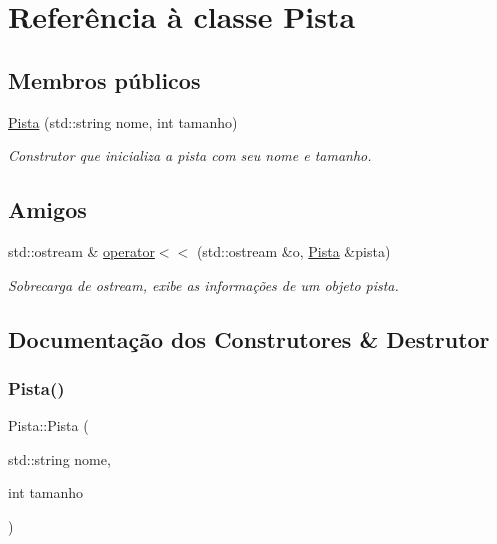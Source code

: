 \hypertarget{classPista}{}\section{Referência à classe Pista}
\label{classPista}
\subsection*{Membros públicos}
\begin{DoxyCompactItemize}
\item 
\hyperlink{classPista_a037a3c407c56d95fa98c6e0525de28cc}{Pista} (std\+::string nome, int tamanho)
\begin{DoxyCompactList}\small\item\em Construtor que inicializa a pista com seu nome e tamanho. \end{DoxyCompactList}\end{DoxyCompactItemize}
\subsection*{Amigos}
\begin{DoxyCompactItemize}
\item 
std\+::ostream \& \hyperlink{classPista_a22c7e3e6f6a5da426ab7e401e3567185}{operator$<$$<$} (std\+::ostream \&o, \hyperlink{classPista}{Pista} \&pista)
\begin{DoxyCompactList}\small\item\em Sobrecarga de ostream, exibe as informações de um objeto pista. \end{DoxyCompactList}\end{DoxyCompactItemize}


\subsection{Documentação dos Construtores \& Destrutor}
\mbox{\label{classPista_a037a3c407c56d95fa98c6e0525de28cc}} 
\subsubsection{\texorpdfstring{Pista()}{Pista()}}
{\footnotesize\ttfamily Pista\+::\+Pista (\begin{DoxyParamCaption}\item[{std\+::string}]{nome,  }\item[{int}]{tamanho }\end{DoxyParamCaption})}



